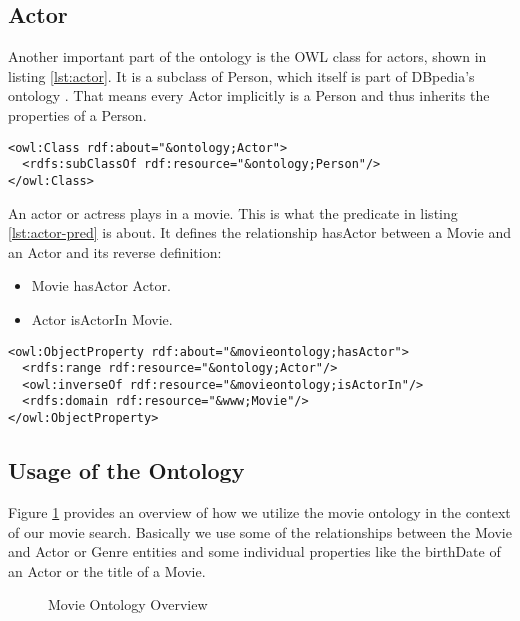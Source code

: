 \subsection{Actor}
Another important part of the ontology is the OWL class for actors, shown in listing \ref{lst:actor}. It is a subclass of Person, which itself is part of DBpedia's ontology \cite{dbpedia:person}. That means every Actor implicitly is a Person and thus inherits the properties of a Person.

\begin{lstlisting}[caption={OWL Actor Class in RDF/XML notation},label={lst:actor}]
<owl:Class rdf:about="&ontology;Actor">
  <rdfs:subClassOf rdf:resource="&ontology;Person"/>
</owl:Class>
\end{lstlisting}

An actor or actress plays in a movie. This is what the predicate in listing \ref{lst:actor-pred} is about. It defines the relationship hasActor between a Movie and an Actor and its reverse definition:
\begin{itemize}
	\item Movie hasActor Actor.
	\item Actor isActorIn Movie.
\end{itemize}

\begin{lstlisting}[caption={Exemplary Actor predicate in RDF/XML notation},label={lst:actor-pred}]
<owl:ObjectProperty rdf:about="&movieontology;hasActor">
  <rdfs:range rdf:resource="&ontology;Actor"/>
  <owl:inverseOf rdf:resource="&movieontology;isActorIn"/>
  <rdfs:domain rdf:resource="&www;Movie"/>
</owl:ObjectProperty>
\end{lstlisting}

\subsection{Usage of the Ontology}

Figure \ref{fig:movie-ont} provides an overview of how we utilize the movie ontology in the context of our movie search. Basically we use some of the relationships between the Movie and Actor or Genre entities and some individual properties like the birthDate of an Actor or the title of a Movie.

\begin{figure}[h]
	\centering
	\caption{Movie Ontology Overview}
	\label{fig:movie-ont}
\end{figure}

